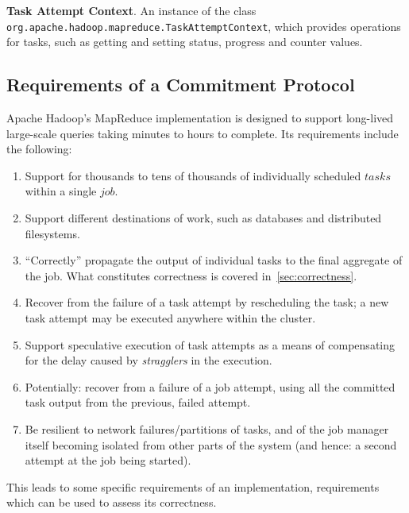 \documentclass[conference]{IEEEtran}
\begin{document}
\textbf{Task Attempt Context}.
An instance of the class
\texttt{org.apache.hadoop.mapreduce.TaskAttemptContext},
which provides operations for tasks, such as getting and setting status,
progress and counter values.


\subsection{Requirements of a Commitment Protocol}
\label{subsec:commit-protocol-requirements}

Apache Hadoop's MapReduce implementation is designed to support long-lived
large-scale queries taking minutes to hours to complete.
Its requirements include the following:

\begin{enumerate}

  \item Support for thousands to tens of thousands of individually scheduled $tasks$
  within a single $job$.

  \item Support different destinations of work, such as databases and
  distributed filesystems.

  \item ``Correctly'' propagate the output of individual tasks to the final
  aggregate of the job.
  What constitutes correctness is covered in\ \ref{sec:correctness}.

  \item Recover from the failure of a task attempt by rescheduling the task;
  a new task attempt may be executed anywhere within the cluster.

  \item Support speculative execution of task attempts as a means of compensating for the
  delay caused by \emph{stragglers} in the execution.

  \item Potentially: recover from a failure of a job attempt, using all the committed
  task output from the previous, failed attempt.

  \item Be resilient to network failures/partitions of tasks, and of the job manager
  itself becoming isolated from other parts of the system (and hence: a second
  attempt at the job being started).

\end{enumerate}

This leads to some specific requirements of an implementation, requirements
which can be used to assess its correctness.
\end{document}
